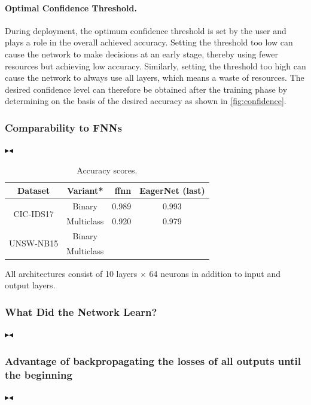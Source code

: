 \documentclass[conference]{IEEEtran}
\newcommand{\mynote}[3]{
    \fbox{\bfseries\sffamily\scriptsize#1}
    {\small$\blacktriangleright$\textsf{\emph{\color{#3}{#2}}}$\blacktriangleleft$}}
\newcommand{\todo}[1]{\mynote{TODO}{#1}{red}}
\begin{document}
\paragraph{Optimal Confidence Threshold.}
During deployment, the optimum confidence threshold is set by the user and plays a role in the overall achieved accuracy. Setting the threshold too low can cause the network to make decisions at an early stage, thereby using fewer resources but achieving low accuracy. Similarly, setting the threshold too high can cause the network to always use all layers, which means a waste of resources. The desired confidence level can therefore be obtained after the training phase by determining on the basis of the desired accuracy as shown in \autoref{fig:confidence}.

\subsubsection{Comparability to FNNs}
\label{subsubsec:comparability_to_fnns}
\todo{Max: Don't understand}

\begin{table}

\centering
\begin{tabular}{ccrc}
\toprule
\textbf{Dataset} & \textbf{Variant*} & \textbf{\gls{ffnn}} & \textbf{EagerNet (last)} \\
\midrule
\multirow{2}{*}{CIC-IDS17} & Binary & 0.989 & 0.993 \\
 & Multiclass & 0.920 & 0.979 \\
\midrule
\multirow{2}{*}{UNSW-NB15} & Binary & & \\
 & Multiclass & & \\
\midrule

\end{tabular}
\vspace{1ex}

{\raggedright * All architectures consist of 10 layers $\times$ 64 neurons in addition to input and output layers. \par}
\caption{Accuracy scores.}


\end{table}

\subsubsection{What Did the Network Learn?}
\todo{Max: Don't understand}

\subsubsection{Advantage of backpropagating the losses of all outputs until the beginning}
\todo{Max: Don't know if this has been already covered elsewhere?}
\end{document}
